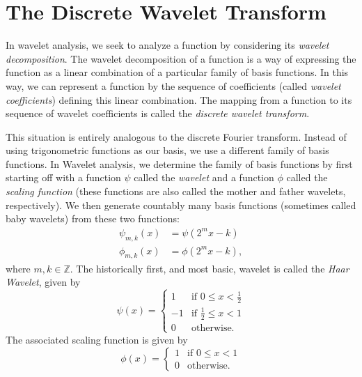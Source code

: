 
\section*{The Discrete Wavelet Transform} %

In wavelet analysis, we seek to analyze a function by considering its \emph{wavelet decomposition}.
The wavelet decomposition of a function is a way of expressing the function as a linear combination
of a particular family of basis functions.
In this way, we can represent a function by the sequence of coefficients (called
\emph{wavelet coefficients}) defining this linear combination.
The mapping from a function to its sequence of wavelet coefficients is called the \emph{discrete
wavelet transform}.

This situation is entirely analogous to the discrete Fourier transform. Instead of using trigonometric functions
as our basis, we use a different family
of basis functions. In Wavelet analysis, we determine the family of basis functions by first starting
off with a function $\psi$ called the \emph{wavelet} and a function $\phi$ called the \emph{scaling function}
(these functions are also called the mother and father wavelets, respectively). We then generate
countably many basis functions (sometimes called baby wavelets) from these two functions:
\begin{align*}
\psi_{m,k}(x) &= \psi(2^mx - k)\\
\phi_{m,k}(x) &= \phi(2^mx - k),
\end{align*}
where $m,k \in \mathbb{Z}$.
The historically first, and most basic, wavelet is called the \emph{Haar Wavelet},
given by
\[
\psi(x) =
 \begin{cases}
  1 & \text{if } 0 \leq x < \frac{1}{2} \\
  -1 & \text{if } \frac{1}{2} \leq x < 1 \\
  0 & \text{otherwise.}
 \end{cases}
\]
The associated scaling function is given by
\[
\phi(x) =
 \begin{cases}
 1 & \text{if } 0 \leq x < 1 \\
 0 & \text{otherwise.}
 \end{cases}
\]

